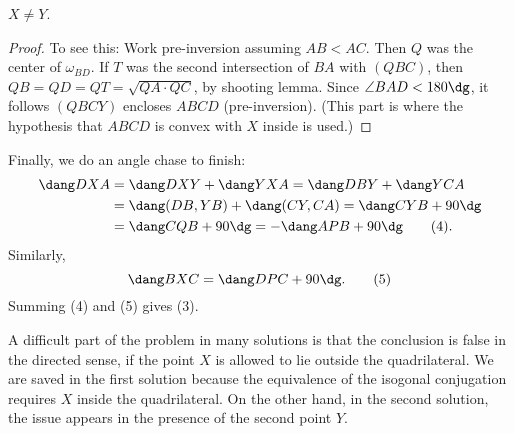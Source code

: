 \documentclass[11pt]{scrartcl}
\begin{document}
\begin{claim*}
  $X \neq Y$.
\end{claim*}
\begin{proof}
  To see this: Work pre-inversion assuming $AB < AC$.
  Then $Q$ was the center of $\omega_{BD}$.
  If $T$ was the second intersection of $BA$ with $(QBC)$,
  then $QB = QD = QT = \sqrt{QA \cdot QC}$, by shooting lemma.
  Since $\angle BAD < 180\dg$,
  it follows $(QBCY)$ encloses $ABCD$ (pre-inversion).
  (This part is where the hypothesis that
  $ABCD$ is convex with $X$ inside is used.)
\end{proof}

Finally, we do an angle chase to finish:
\begin{align*}
  \dang DXA &= \dang DXY + \dang YXA = \dang DBY + \dang YCA \\
  &= \dang (DB, YB) + \dang (CY, CA) = \dang CYB + 90\dg \\
  &= \dang CQB + 90\dg = -\dang APB + 90\dg \tag{4}.
\end{align*}
Similarly,
\[ \dang BXC = \dang DPC + 90\dg. \tag{5} \]
Summing (4) and (5) gives (3).


\begin{remark*}
  A difficult part of the problem in many solutions
  is that the conclusion is false in the directed sense,
  if the point $X$ is allowed to lie outside the quadrilateral.
  We are saved in the first solution because the equivalence
  of the isogonal conjugation requires $X$ inside the quadrilateral.
  On the other hand, in the second solution,
  the issue appears in the presence of the second point $Y$.
\end{remark*}
\pagebreak
\end{document}
